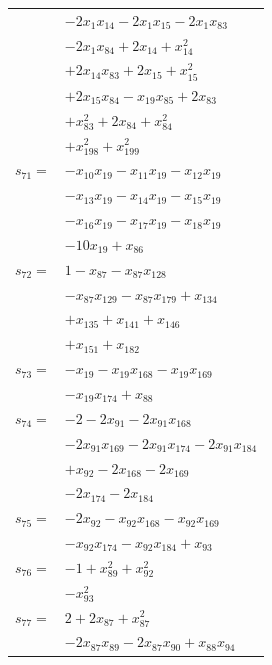 \begin{longtable}{@{}r@{\;}l@{}}
 & \(\displaystyle -2x_{1}x_{14} -2x_{1}x_{15} -2x_{1}x_{83}\) \\
 & \(\displaystyle -2x_{1}x_{84} +2x_{14} +x_{14}^{2}\) \\
 & \(\displaystyle +2x_{14}x_{83} +2x_{15} +x_{15}^{2}\) \\
 & \(\displaystyle +2x_{15}x_{84} -x_{19}x_{85} +2x_{83}\) \\
 & \(\displaystyle +x_{83}^{2} +2x_{84} +x_{84}^{2}\) \\
 & \(\displaystyle +x_{198}^{2} +x_{199}^{2}\) \\[3pt]
\(s_{71}=\) & \(\displaystyle -x_{10}x_{19} -x_{11}x_{19} -x_{12}x_{19}\) \\
 & \(\displaystyle -x_{13}x_{19} -x_{14}x_{19} -x_{15}x_{19}\) \\
 & \(\displaystyle -x_{16}x_{19} -x_{17}x_{19} -x_{18}x_{19}\) \\
 & \(\displaystyle -10x_{19} +x_{86}\) \\[3pt]
\(s_{72}=\) & \(\displaystyle 1 -x_{87} -x_{87}x_{128}\) \\
 & \(\displaystyle -x_{87}x_{129} -x_{87}x_{179} +x_{134}\) \\
 & \(\displaystyle +x_{135} +x_{141} +x_{146}\) \\
 & \(\displaystyle +x_{151} +x_{182}\) \\[3pt]
\(s_{73}=\) & \(\displaystyle -x_{19} -x_{19}x_{168} -x_{19}x_{169}\) \\
 & \(\displaystyle -x_{19}x_{174} +x_{88}\) \\[3pt]
\(s_{74}=\) & \(\displaystyle -2 -2x_{91} -2x_{91}x_{168}\) \\
 & \(\displaystyle -2x_{91}x_{169} -2x_{91}x_{174} -2x_{91}x_{184}\) \\
 & \(\displaystyle +x_{92} -2x_{168} -2x_{169}\) \\
 & \(\displaystyle -2x_{174} -2x_{184}\) \\[3pt]
\(s_{75}=\) & \(\displaystyle -2x_{92} -x_{92}x_{168} -x_{92}x_{169}\) \\
 & \(\displaystyle -x_{92}x_{174} -x_{92}x_{184} +x_{93}\) \\[3pt]
\(s_{76}=\) & \(\displaystyle -1 +x_{89}^{2} +x_{92}^{2}\) \\
 & \(\displaystyle -x_{93}^{2}\) \\[3pt]
\(s_{77}=\) & \(\displaystyle 2 +2x_{87} +x_{87}^{2}\) \\
 & \(\displaystyle -2x_{87}x_{89} -2x_{87}x_{90} +x_{88}x_{94}\) \\

\end{longtable}
